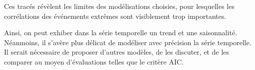 \documentclass[../report.tex]{subfiles}
\begin{document}
\par Ces tracés révèlent les limites des modélisations choisies, pour lesquelles les corrélations des événements extrêmes sont visiblement trop importantes.

\par Ainsi, on peut exhiber dans la série temporelle un trend et une saisonnalité. Néanmoins, il s'avère plus délicat de modéliser avec précision la série temporelle. Il serait nécessaire de proposer d'autres modèles, de les discuter, et de les comparer au moyen d'évaluations telles que le critère AIC.
\end{document}
